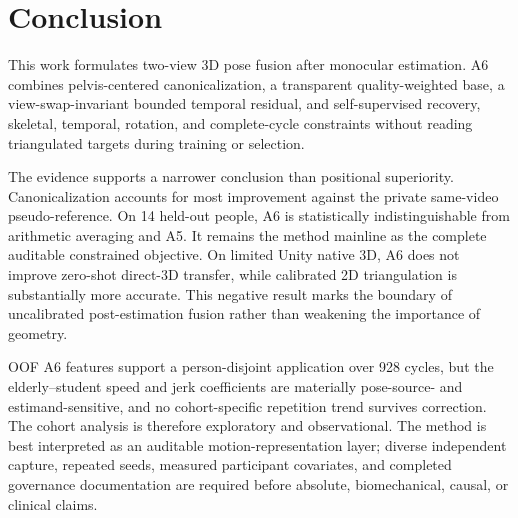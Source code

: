 \section{Conclusion}
\label{sec:conclusion}

This work formulates two-view 3D pose fusion after monocular estimation. A6
combines pelvis-centered canonicalization, a transparent quality-weighted base,
a view-swap-invariant bounded temporal residual, and self-supervised recovery,
skeletal, temporal, rotation, and complete-cycle constraints without reading
triangulated targets during training or selection.

The evidence supports a narrower conclusion than positional superiority.
Canonicalization accounts for most improvement against the private same-video
pseudo-reference. On 14 held-out people, A6 is statistically
indistinguishable from arithmetic averaging and A5. It remains the method
mainline as the complete auditable constrained objective. On limited Unity
native 3D, A6 does not improve zero-shot direct-3D transfer, while calibrated
2D triangulation is substantially more accurate. This negative result marks the
boundary of uncalibrated post-estimation fusion rather than weakening the
importance of geometry.

OOF A6 features support a person-disjoint application over 928 cycles, but the
elderly--student speed and jerk coefficients are materially pose-source- and
estimand-sensitive, and no cohort-specific repetition trend survives
correction. The cohort analysis is therefore exploratory and observational.
The method is best interpreted as an auditable motion-representation layer;
diverse independent capture, repeated seeds, measured participant covariates,
and completed governance documentation are required before absolute,
biomechanical, causal, or clinical claims.
